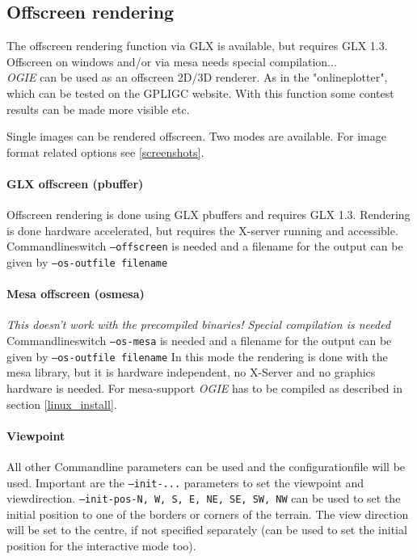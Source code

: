 \subsection{Offscreen rendering}

The offscreen rendering function via GLX is available, but requires GLX 1.3. Offscreen on windows and/or via mesa needs
special compilation... \\

\emph{OGIE} can be used as an offscreen 2D/3D renderer. As in the "onlineplotter", which can be tested on the GPLIGC website. With this function some contest results can be made more visible etc.

Single images can be rendered offscreen. Two modes are available. For image format related options see \ref{screenshots}.

\paragraph{GLX offscreen (pbuffer)}
Offscreen rendering is done using GLX pbuffers and requires GLX 1.3. Rendering is done hardware accelerated, but requires the X-server running and accessible.
Commandlineswitch \texttt{--offscreen} is needed and
a filename for the output can be given by \texttt{--os-outfile filename}

\paragraph{Mesa offscreen (osmesa)}
\emph{This doesn't work with the precompiled binaries! Special compilation is needed}
Commandlineswitch \texttt{--os-mesa} is needed and
a filename for the output can be given by \texttt{--os-outfile filename}
In this mode the rendering is done with the mesa library, but it is hardware independent, no X-Server and no graphics hardware is needed.
For mesa-support \emph{OGIE} has to be compiled as described in section \ref{linux_install}.

\paragraph{Viewpoint}
All other Commandline parameters can be used and the configurationfile will be used.
Important are the \texttt{--init-...} parameters to set the viewpoint and viewdirection.
\texttt{--init-pos-N, W, S, E, NE, SE, SW, NW}  can be used to set the initial position to one
of the borders or corners of the terrain. The view direction will be set to the
centre, if not specified separately (can be used to set the initial position for
the interactive mode too).





